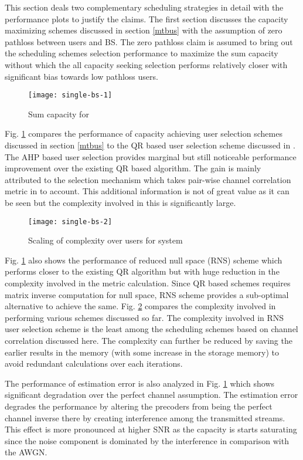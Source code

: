 
This section deals two complementary scheduling strategies in detail with the performance plots to justify the claims. The first section discusses the capacity maximizing schemes discussed in section \ref{mtbus} with the assumption of zero pathloss between users and BS. The zero pathloss claim is assumed to bring out the scheduling schemes selection performance to maximize the sum capacity without which the all capacity seeking selection performs relatively closer with significant bias towards low pathloss users.
\begin{figure}
\centering
\texttt{[image: single-bs-1]}
\caption[short]{Sum capacity for }
\label{single-bs-f1}
\end{figure}

Fig. \ref{single-bs-f1} compares the performance of capacity achieving user selection schemes discussed in section \ref{mtbus} to the QR based user selection scheme discussed in \cite{antti_user_selection,jin2010novel}. The AHP based user selection provides marginal but still noticeable performance improvement over the existing QR based algorithm. The gain is mainly attributed to the selection mechanism which takes pair-wise channel correlation metric in to account. This additional information is not of great value as it can be seen but the complexity involved in this is significantly large.
\begin{figure}
\centering
\texttt{[image: single-bs-2]}
\caption[short]{Scaling of complexity over users for  system}
\label{single-bs-f2}
\end{figure}

Fig. \ref{single-bs-f1} also shows the performance of reduced null space (RNS) scheme which performs closer to the existing QR algorithm but with huge reduction in the complexity involved in the metric calculation. Since QR based schemes requires matrix inverse computation for null space, RNS scheme provides a sub-optimal alternative to achieve the same. Fig. \ref{single-bs-f2} compares the complexity involved in performing various schemes discussed so far. The complexity involved in RNS user selection scheme is the least among the scheduling schemes based on channel correlation discussed here. The complexity can further be reduced by saving the earlier results in the memory (with some increase in the storage memory) to avoid redundant calculations over each iterations. 

The performance of estimation error is also analyzed in Fig. \ref{single-bs-f1} which shows significant degradation over the perfect channel assumption. The estimation error degrades the performance by altering the precoders from being the perfect channel inverse there by creating interference among the transmitted streams. This effect is more pronounced at higher SNR as the capacity is starts saturating since the noise component is dominated by the interference in comparison with the AWGN.
